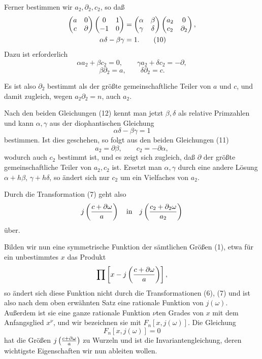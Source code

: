 \documentclass[11pt]{article}
\begin{document}
Ferner bestimmen wir $a_2,\partial_2,c_2$, so daß
\begin{align}
 \begin{pmatrix}a&0\\c&\partial\end{pmatrix}
 \begin{pmatrix}0&1\\-1&0\end{pmatrix}
 &=
 \begin{pmatrix}\alpha&\beta\\ \gamma&\delta\end{pmatrix}
 \begin{pmatrix}a_2&0\\c_2&\partial_2\end{pmatrix},\notag\\
 \alpha\delta-\beta\gamma&=1.
\tag{10}
\end{align}
Dazu ist erforderlich
\begin{equation}
 \alpha a_2+\beta c_2=0,
 \qquad
 \gamma a_2+\delta c_2=-\partial,
\tag{11}
\end{equation}
\begin{equation}
 \beta\partial_2=a,
 \qquad
 \delta\partial_2=c.
\tag{12}
\end{equation}

Es ist also $\partial_2$ bestimmt als der größte gemeinschaftliche Teiler von $a$ und $c$,
und damit zugleich, wegen $a_2\partial_2=n$, auch $a_2$.

Nach den beiden Gleichungen (12) kennt man jetzt $\beta,\delta$ als relative Primzahlen
und kann $\alpha,\gamma$ aus der diophantischen Gleichung
\[
 \alpha\delta-\beta\gamma=1
\]
bestimmen. Ist dies geschehen, so folgt aus den beiden Gleichungen (11)
\begin{equation}
 a_2=\partial\beta,
 \qquad
 c_2=-\partial\alpha,
\tag{13}
\end{equation}
wodurch auch $c_2$ bestimmt ist, und es zeigt sich zugleich, daß $\partial$ der größte
gemeinschaftliche Teiler von $a_2,c_2$ ist. Ersetzt man $\alpha,\gamma$ durch eine andere
Lösung $\alpha+h\beta$, $\gamma+h\delta$, so ändert sich nur $c_2$ um ein Vielfaches von
$a_2$.

Durch die Transformation (7) geht also
\[
 j\left({c+\partial\omega\over a}\right)
\quad\hbox{in}\quad
j\left({c_2+\partial_2\omega\over a_2}\right)
\]
über.

Bilden wir nun eine symmetrische Funktion der sämtlichen Größen (1), etwa für ein
unbestimmtes $x$ das Produkt
\[
 \prod\left[x-j\left({c+\partial\omega\over a}\right)\right],
\]
so ändert sich diese Funktion nicht durch die Transformationen (6), (7) und ist also nach
dem oben erwähnten Satz eine rationale Funktion von $j(\omega)$. Außerdem ist sie eine
ganze rationale Funktion $\nu$ten Grades von $x$ mit dem Anfangsglied $x^\nu$, und wir
bezeichnen sie mit $F_n[x,j(\omega)]$. Die Gleichung
\begin{equation}
 F_n[x,j(\omega)]=0
\tag{14}
\end{equation}
hat die Größen $j\left({c+\partial\omega\over a}\right)$ zu Wurzeln und ist die
Invariantengleichung, deren wichtigste Eigenschaften wir nun ableiten wollen.
\end{document}

